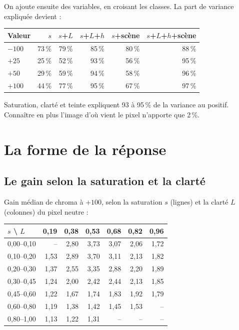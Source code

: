 On ajoute ensuite des variables, en croisant les classes. La part de variance
expliquée devient :

\begin{center}
\begin{tabular}{lrrrrr}
\toprule
Valeur & $s$ & $s$+$L$ & $s$+$L$+$h$ & $s$+scène & $s$+$L$+$h$+scène\\
\midrule
$-100$ & 73\,\% & 79\,\% & 85\,\% & 80\,\% & 88\,\%\\
$+25$ & 25\,\% & 52\,\% & 93\,\% & 56\,\% & 95\,\%\\
$+50$ & 29\,\% & 59\,\% & 94\,\% & 58\,\% & 96\,\%\\
$+100$ & 44\,\% & 77\,\% & 95\,\% & 67\,\% & 97\,\%\\
\bottomrule
\end{tabular}
\end{center}

Saturation, clarté et teinte expliquent 93 à 95\,\% de la variance au positif.
Connaître en plus l'image d'où vient le pixel n'apporte que 2\,\%.


\section{La forme de la réponse}
\subsection{Le gain selon la saturation et la clarté}
Gain médian de chroma à $+100$, selon la saturation $s$ (lignes) et la clarté
$L$ (colonnes) du pixel neutre :

\begin{center}
\begin{tabular}{lrrrrrr}
\toprule
$s$ \textbackslash{} $L$ & 0,19 & 0,38 & 0,53 & 0,68 & 0,82 & 0,96\\
\midrule
0,00--0,10 & -- & 2,80 & 3,73 & 3,07 & 2,06 & 1,72\\
0,10--0,20 & 1,53 & 2,89 & 3,70 & 3,11 & 2,13 & 1,82\\
0,20--0,30 & 1,37 & 2,55 & 3,35 & 2,88 & 2,20 & 1,89\\
0,30--0,45 & 1,24 & 2,00 & 2,42 & 2,44 & 2,13 & 1,85\\
0,45--0,60 & 1,22 & 1,67 & 1,74 & 1,83 & 1,92 & 1,79\\
0,60--0,80 & 1,19 & 1,38 & 1,42 & 1,45 & 1,53 & --\\
0,80--1,00 & 1,13 & 1,22 & 1,31 & -- & -- & --\\
\bottomrule
\end{tabular}
\end{center}


